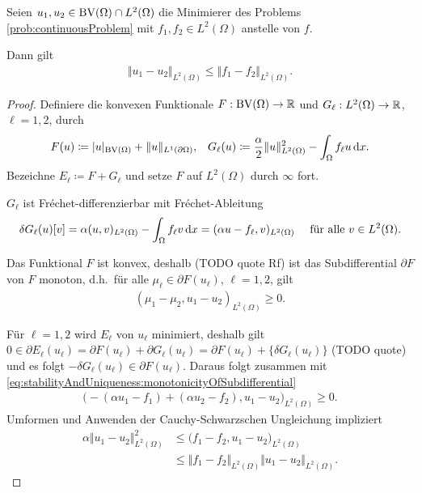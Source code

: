\begin{theorem}
  \label{thm:contProbStabAndUniqu}
  Seien $u_1,u_2\in \textup{BV}(\Omega)\cap L^2(\Omega)$ die Minimierer des Problems
  \ref{prob:continuousProblem} mit $f_1,f_2\in L^2(\Omega)$ anstelle von $f$.

  Dann gilt 
  \begin{align*}
    \Vert u_1 - u_2\Vert_{L^2(\Omega)} \leq \Vert f_1-f_2\Vert_{L^2(\Omega)}.
  \end{align*}
\end{theorem}

\begin{proof}
  Definiere die konvexen Funktionale $F:\textup{BV}(\Omega)\to \mathbb{R}$ und 
  $G_\ell:L^2(\Omega)\to \mathbb{R}$, $\ell=1,2$, durch
  \begin{align*}
    F(u) &\coloneqq |u|_{\textup{BV}(\Omega)} + \Vert u \Vert_{L^1(\partial\Omega)},&
    G_\ell(u)\coloneqq \frac{\alpha}{2}\Vert u\Vert_{L^2(\Omega)}^2 -
    \int_\Omega f_\ell u\,\mathrm{d}x.
  \end{align*}
  Bezeichne $E_\ell\coloneqq F+G_\ell$ und setze $F$ auf $L^2(\Omega)$
  durch $\infty$ fort.

  $G_\ell$ ist Fr\'echet-differenzierbar mit Fr\'echet-Ableitung
  \begin{align*}
    \delta G_\ell(u)[v] = \alpha (u,v)_{L^2(\Omega)} - \int_\Omega f_\ell v\,\mathrm{d}x 
    = (\alpha u-f_\ell ,v)_{L^2(\Omega)} \quad 
    \text{ für alle } v\in L^2(\Omega).
  \end{align*}

  Das Funktional $F$ ist konvex, deshalb (TODO quote Rf) ist das Subdifferential
  $\partial F$ von $F$ monoton, d.h.\ für alle $\mu_\ell\in \partial F(u_\ell)$,
  $\ell=1,2$, gilt
  \begin{align}\label{eq:stabilityAndUniqueness:monotonicityOfSubdifferential}
    (\mu_1-\mu_2,u_1-u_2)_{L^2(\Omega)}\geq 0.
  \end{align}

  Für $\ell=1,2$ wird $E_\ell$ von $u_\ell$ minimiert, 
  deshalb gilt $0\in\partial E_\ell(u_\ell)
  = \partial F(u_\ell)+\partial G_\ell(u_\ell)=\partial F(u_\ell)+
  \{\delta G_\ell(u_\ell)\}$ (TODO quote) und es folgt
  $-\delta G_\ell(u_\ell)\in\partial F(u_\ell)$.
  Daraus folgt zusammen mit
  \eqref{eq:stabilityAndUniqueness:monotonicityOfSubdifferential}
  \begin{align*}
    \big( -(\alpha u_1 - f_1) + (\alpha u_2 - f_2), u_1 - u_2\big)_{L^2(\Omega)}
    \geq 0.
  \end{align*}
  Umformen und Anwenden der Cauchy-Schwarzschen Ungleichung impliziert
  \begin{align*}
    \alpha \Vert u_1 - u_2 \Vert_{L^2(\Omega)}^2
    &\leq
    \big(f_1 -f_2, u_1-u_2 \big)_{L^2(\Omega)}\\
    &\leq
    \Vert f_1-f_2\Vert_{L^2(\Omega)}\Vert u_1 - u_2\Vert_{L^2(\Omega)}.
  \end{align*}


\end{proof}
